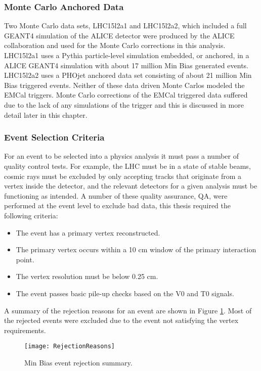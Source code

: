 \subsubsection{Monte Carlo Anchored Data}
Two Monte Carlo data sets, LHC15l2a1 and LHC15l2a2, which included a full GEANT4 simulation of the ALICE detector were produced by the ALICE collaboration and used for the Monte Carlo corrections in this analysis.   LHC15l2a1 uses a Pythia particle-level simulation embedded, or anchored, in a ALICE GEANT4 simulation with about 17 million Min Bias generated events.  LHC15l2a2 uses a PHOjet anchored data set consisting of about 21 million Min Bias triggered events.  Neither of these data driven Monte Carlos modeled the EMCal triggers.  Monte Carlo corrections of the EMCal triggered data suffered due to the lack of any simulations of the trigger and this is discussed in more detail later in this chapter.

\subsubsection{Event Selection Criteria}
For an event to be selected into a physics analysis it must pass a number of quality control tests.  For example, the LHC must be in a state of stable beams, cosmic rays must be excluded by only accepting tracks that originate from a vertex inside the detector, and the relevant detectors for a given analysis must be functioning as intended.  A number of these quality assurance, QA, were performed at the event level to exclude bad data, this thesis required the following criteria:

\begin{itemize}
  \item The event has a primary vertex reconstructed.
  \item The primary vertex occurs within a 10 cm window of the primary interaction point.
  \item The vertex resolution must be below 0.25 cm.
  \item The event passes basic pile-up checks based on the V0 and T0 signals.
\end{itemize}


A summary of the rejection reasons for an event are shown in Figure \ref{fig:eventqa}.  Most of the rejected events were excluded due to the event not satisfying the vertex requirements.

\begin{figure}[h]
\texttt{[image: RejectionReasons]}
\centering
\caption{Min Bias event rejection summary.}
\label{fig:eventqa}
\end{figure}

